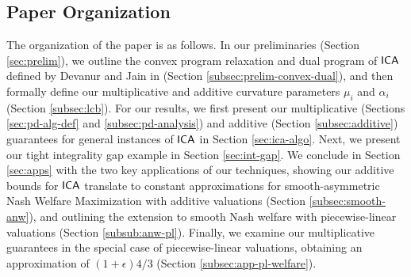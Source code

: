 \subsection{Paper Organization}
The organization of the paper is as follows. In our preliminaries  (Section \ref{sec:prelim}), we outline the convex program relaxation  and dual program of $\mathsf{ICA} $ defined by Devanur and Jain in \cite{devanur2012online} (Section \ref{subsec:prelim-convex-dual}), and then formally define our multiplicative and additive curvature parameters $\mu_i$ and $\alpha_i$ (Section \ref{subsec:lcb}).
For our results, we first present our multiplicative (Sections \ref{sec:pd-alg-def} and \ref{subsec:pd-analysis}) and additive (Section \ref{subsec:additive}) guarantees for general instances of $\mathsf{ICA}$ in Section \ref{sec:ica-algo}.  
Next, we present our tight integrality gap example in Section \ref{sec:int-gap}. 
We conclude in Section \ref{sec:apps} with the two key applications of our techniques, showing our additive bounds for $\mathsf{ICA}$ translate to constant approximations for smooth-asymmetric Nash Welfare Maximization with additive valuations (Section \ref{subsec:smooth-anw}), and outlining the extension to smooth Nash welfare with piecewise-linear valuations (Section \ref{subsub:anw-pl}). 
Finally, we examine our multiplicative guarantees in the special case of piecewise-linear valuations, obtaining an approximation of $(1+\epsilon)4/3$ (Section \ref{subsec:app-pl-welfare}).
